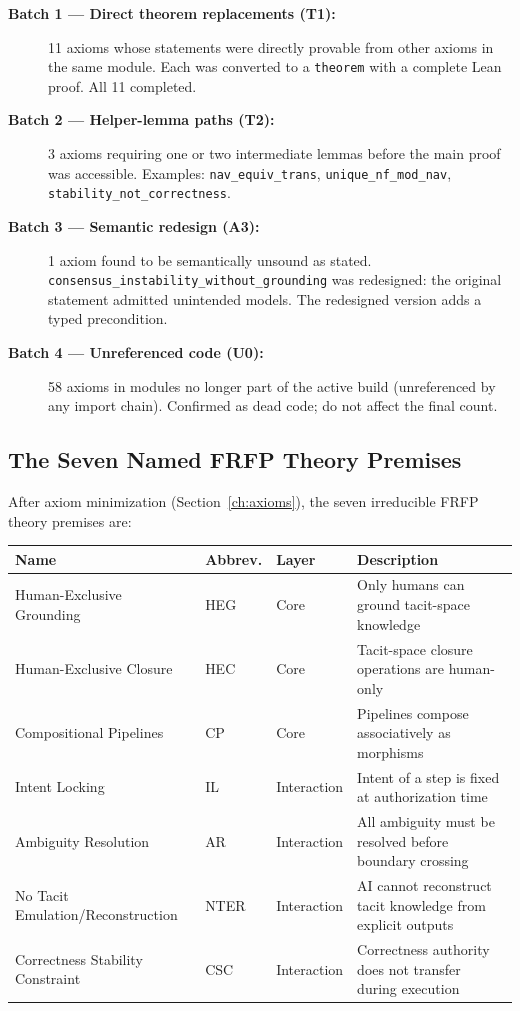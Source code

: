 \begin{description}
  \item[\textbf{Batch 1 --- Direct theorem replacements (T1):}]
        11 axioms whose statements were directly provable from other axioms in
        the same module. Each was converted to a \texttt{theorem} with a complete
        Lean proof. All 11 completed.

  \item[\textbf{Batch 2 --- Helper-lemma paths (T2):}]
        3 axioms requiring one or two intermediate lemmas before the main proof
        was accessible. Examples: \texttt{nav\_equiv\_trans},
        \texttt{unique\_nf\_mod\_nav}, \texttt{stability\_not\_correctness}.

  \item[\textbf{Batch 3 --- Semantic redesign (A3):}]
        1 axiom found to be semantically unsound as stated.
        \texttt{consensus\_instability\_without\_grounding} was redesigned: the
        original statement admitted unintended models. The redesigned version adds
        a typed precondition.

  \item[\textbf{Batch 4 --- Unreferenced code (U0):}]
        58 axioms in modules no longer part of the active build (unreferenced by
        any import chain). Confirmed as dead code; do not affect the final count.
\end{description}

\subsection{The Seven Named FRFP Theory Premises}

After axiom minimization (Section~\ref{ch:axioms}), the seven irreducible FRFP
theory premises are:

\begin{center}
\begin{tabular}{lllp{6cm}}
\toprule
Name & Abbrev. & Layer & Description \\
\midrule
Human-Exclusive Grounding & HEG & Core & Only humans can ground tacit-space knowledge \\
Human-Exclusive Closure & HEC & Core & Tacit-space closure operations are human-only \\
Compositional Pipelines & CP & Core & Pipelines compose associatively as morphisms \\
Intent Locking & IL & Interaction & Intent of a step is fixed at authorization time \\
Ambiguity Resolution & AR & Interaction & All ambiguity must be resolved before boundary crossing \\
No Tacit Emulation/Reconstruction & NTER & Interaction & AI cannot reconstruct tacit knowledge from explicit outputs \\
Correctness Stability Constraint & CSC & Interaction & Correctness authority does not transfer during execution \\
\bottomrule
\end{tabular}
\end{center}

